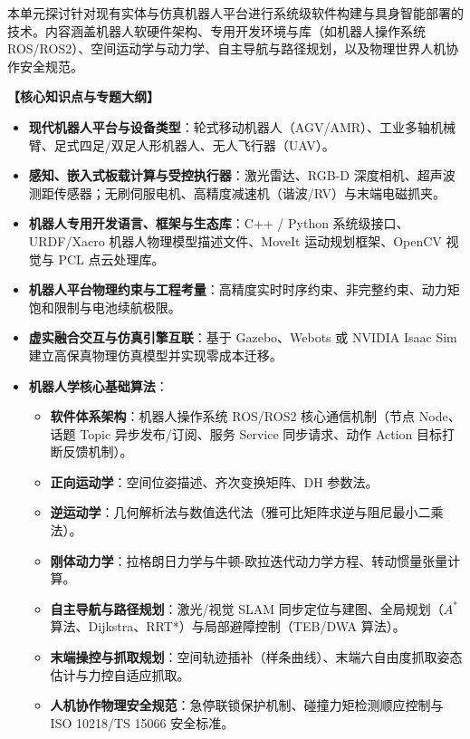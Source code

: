 本单元探讨针对现有实体与仿真机器人平台进行系统级软件构建与具身智能部署的技术。内容涵盖机器人软硬件架构、专用开发环境与库（如机器人操作系统 ROS/ROS2）、空间运动学与动力学、自主导航与路径规划，以及物理世界人机协作安全规范。

\textbf{【核心知识点与专题大纲】}
\begin{itemize}
    \item \textbf{现代机器人平台与设备类型}：轮式移动机器人（AGV/AMR）、工业多轴机械臂、足式四足/双足人形机器人、无人飞行器（UAV）。
    \item \textbf{感知、嵌入式板载计算与受控执行器}：激光雷达、RGB-D 深度相机、超声波测距传感器；无刷伺服电机、高精度减速机（谐波/RV）与末端电磁抓夹。
    \item \textbf{机器人专用开发语言、框架与生态库}：C++ / Python 系统级接口、URDF/Xacro 机器人物理模型描述文件、MoveIt 运动规划框架、OpenCV 视觉与 PCL 点云处理库。
    \item \textbf{机器人平台物理约束与工程考量}：高精度实时时序约束、非完整约束、动力矩饱和限制与电池续航极限。
    \item \textbf{虚实融合交互与仿真引擎互联}：基于 Gazebo、Webots 或 NVIDIA Isaac Sim 建立高保真物理仿真模型并实现零成本迁移。
    \item \textbf{机器人学核心基础算法}：
    \begin{itemize}
        \item \textbf{软件体系架构}：机器人操作系统 ROS/ROS2 核心通信机制（节点 Node、话题 Topic 异步发布/订阅、服务 Service 同步请求、动作 Action 目标打断反馈机制）。
        \item \textbf{正向运动学}：空间位姿描述、齐次变换矩阵、DH 参数法。
        \item \textbf{逆运动学}：几何解析法与数值迭代法（雅可比矩阵求逆与阻尼最小二乘法）。
        \item \textbf{刚体动力学}：拉格朗日力学与牛顿-欧拉迭代动力学方程、转动惯量张量计算。
        \item \textbf{自主导航与路径规划}：激光/视觉 SLAM 同步定位与建图、全局规划（$A^*$ 算法、Dijkstra、RRT*）与局部避障控制（TEB/DWA 算法）。
        \item \textbf{末端操控与抓取规划}：空间轨迹插补（样条曲线）、末端六自由度抓取姿态估计与力控自适应抓取。
        \item \textbf{人机协作物理安全规范}：急停联锁保护机制、碰撞力矩检测顺应控制与 ISO 10218/TS 15066 安全标准。
    \end{itemize}
\end{itemize}

